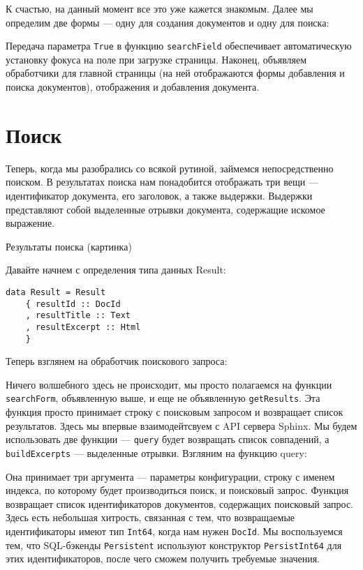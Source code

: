 

К счастью, на данный момент все это уже кажется знакомым. Далее мы определим две формы --- одну для создания документов и одну для поиска:



Передача параметра \lstinline'True' в функцию \lstinline'searchField' обеспечивает автоматическую установку фокуса на поле при загрузке страницы. Наконец, объявляем обработчики для главной страницы (на ней отображаются формы добавления и поиска документов), отображения и добавления документа.



\section{Поиск} %

Теперь, когда мы разобрались со всякой рутиной, займемся непосредственно поиском. В результатах поиска нам понадобится отображать три вещи --- идентификатор документа, его заголовок, а также выдержки. Выдержки представляют собой выделенные отрывки документа, содержащие искомое выражение.

Результаты поиска (картинка)

Давайте начнем с определения типа данных Result:

\begin{lstlisting}
data Result = Result
    { resultId :: DocId
    , resultTitle :: Text
    , resultExcerpt :: Html
    }
\end{lstlisting}

Теперь взглянем на обработчик поискового запроса:




Ничего волшебного здесь не происходит, мы просто полагаемся на функции \lstinline'searchForm', объявленную выше, и еще не объявленную \lstinline'getResults'. Эта функция просто принимает строку с поисковым запросом и возвращает список результатов. Здесь мы впервые взаимодейтсвуем с API сервера Sphinx. Мы будем использовать две функции --- \lstinline'query' будет возвращать список совпадений, а \lstinline'buildExcerpts' --- выделенные отрывки. Взгляним на функцию query:



Она принимает три аргумента --- параметры конфигурации, строку с именем индекса, по которому будет производиться поиск, и поисковый запрос. Функция возвращает список идентификаторов документов, содержащих поисковый запрос. Здесь есть небольшая хитрость, связанная с тем, что возвращаемые идентификаторы имеют тип \lstinline'Int64', когда нам нужен \lstinline'DocId'. Мы воспользуемся тем, что SQL-бэкенды \lstinline'Persistent' используют конструктор \lstinline'PersistInt64' для этих идентификаторов, после чего сможем получить требуемые значения. %

